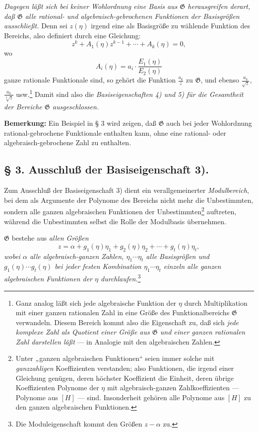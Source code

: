 \documentclass[11pt]{article}
\begin{document}
\emph{Dagegen läßt sich bei keiner Wohlordnung eine Basis aus $\mathfrak G$
herausgreifen derart, daß $\mathfrak G$ alle rational- und
algebraisch-gebrochenen Funktionen der Basisgrößen ausschließt.} Denn sei
$z(\eta)$ irgend eine als Basisgröße zu wählende Funktion des Bereichs, also
definiert durch eine Gleichung:
\[
 z^k+A_1(\eta)z^{k-1}+\cdots+A_k(\eta)=0,
\]
wo
\[
 A_i(\eta)=a_i\cdot\frac{E_1(\eta)}{E_2(\eta)}
\]
ganze rationale Funktionale sind, so gehört die Funktion
$\frac{a_k}{z}$ zu $\mathfrak G$, und ebenso
$\frac{a_k}{\sqrt z}$, $\frac{a_k}{\sqrt[3]z}$ usw.\footnote{Ganz analog läßt
sich jede algebraische Funktion der $\eta$ durch Multiplikation mit einer ganzen
rationalen Zahl in eine Größe des Funktionalbereichs $\mathfrak G$ verwandeln.
Diesem Bereich kommt also die Eigenschaft zu, daß sich \emph{jede komplexe Zahl
als Quotient einer Größe aus $\mathfrak G$ und einer ganzen rationalen Zahl
darstellen läßt} --- in Analogie mit den algebraischen Zahlen.} Damit sind also
die \emph{Basiseigenschaften 4) und 5) für die Gesamtheit der Bereiche
$\mathfrak G$ ausgeschlossen.}

\textbf{Bemerkung:} Ein Beispiel in § 3 wird zeigen, daß $\mathfrak G$ auch bei
jeder Wohlordnung rational-gebrochene Funktionale enthalten kann, ohne eine
rational- oder algebraisch-gebrochene Zahl zu enthalten.

\subsection*{§ 3. Ausschluß der Basiseigenschaft 3).}

Zum Ausschluß der Basiseigenschaft 3) dient ein verallgemeinerter
\emph{Modulbereich}, bei dem als Argumente der Polynome des Bereichs nicht mehr
die Unbestimmten, sondern alle ganzen algebraischen Funktionen der
Unbestimmten\footnote{Unter „ganzen algebraischen Funktionen“ seien immer solche
mit \emph{ganzzahligen} Koeffizienten verstanden; also Funktionen, die irgend
einer Gleichung genügen, deren höchster Koeffizient die Einheit, deren übrige
Koeffizienten Polynome der $\eta$ mit algebraisch-ganzen Zahlkoeffizienten ---
Polynome aus $[H]$ --- sind. Insonderheit gehören alle Polynome aus $[H]$ zu
den ganzen algebraischen Funktionen.} auftreten, während die Unbestimmten selbst
die Rolle der Modulbasis übernehmen.

$\mathfrak G$ bestehe aus \emph{allen Größen}
\begin{equation}
 z=\alpha+g_1(\eta)\eta_1+g_2(\eta)\eta_2+\cdots+g_t(\eta)\eta_t,
\tag{1}
\end{equation}
\emph{wobei $\alpha$ alle algebraisch-ganzen Zahlen,
$\eta_1\cdots \eta_t$ alle Basisgrößen und $g_1(\eta)\cdots g_t(\eta)$ bei
jeder festen Kombination $\eta_1\cdots\eta_t$ einzeln alle ganzen algebraischen
Funktionen der $\eta$ durchlaufen.}\footnote{Die Moduleigenschaft kommt den
Größen $z-\alpha$ zu.}
\end{document}
